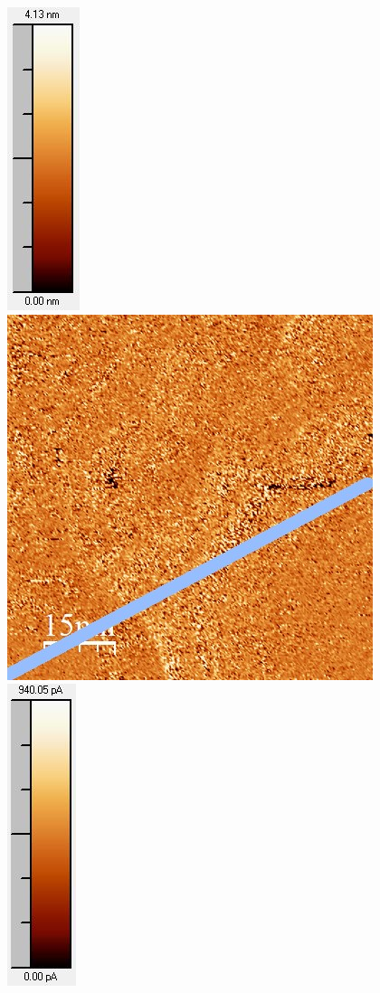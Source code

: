 \documentclass[12pt,a4paper]{article}
\begin{document}
\begin{figure}[H]
\includegraphics[scale=0.6]{Bilder/Anhang/Zeit/0_6_Zeit_nach_Skala.jpg}
\includegraphics[scale=0.6]{Bilder/Anhang/Zeit/Strom/0_6_Zeit_vor_Strom.jpg}
\includegraphics[scale=0.6]{Bilder/Anhang/Zeit/Strom/0_6_Zeit_vor_Strom_Skala.jpg}

\end{figure}
\end{document}
